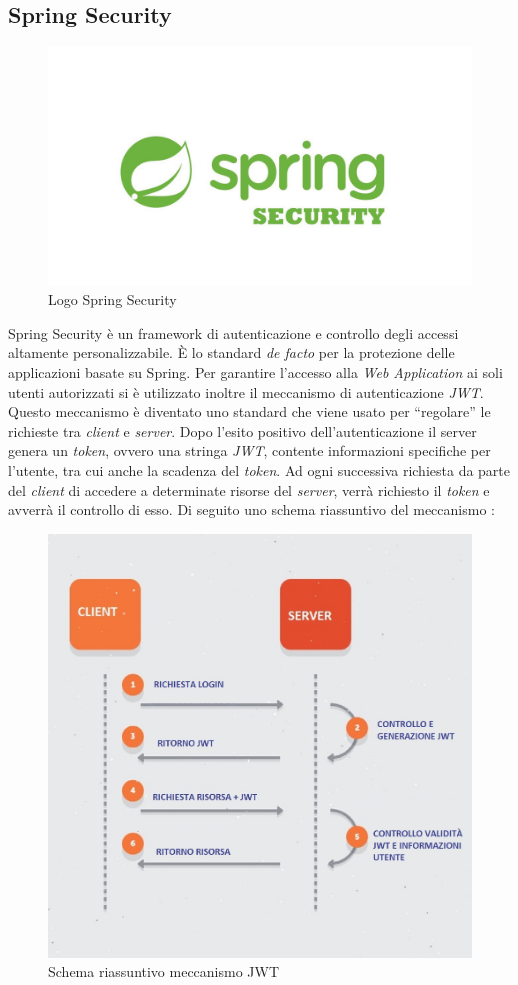 \subsection{Spring Security}

\begin{figure}
\begin{center}
\includegraphics[width=0.45\columnwidth]{images/springsec.jpeg}
\end{center}
\caption{Logo Spring Security}
\label{fig:springsec}
\end{figure}

Spring Security è un \gls{framework} di autenticazione e controllo degli accessi altamente personalizzabile. È lo standard \textit{de facto} per la protezione delle applicazioni basate su Spring. Per garantire l'accesso alla \textit{Web Application} ai soli utenti autorizzati si è utilizzato inoltre il meccanismo di autenticazione \textit{JWT}. Questo meccanismo è diventato uno standard che viene usato per “regolare” le richieste tra  \textit{client} e \textit{server}. Dopo l'esito positivo dell'autenticazione il server genera un \textit{token}, ovvero una stringa \textit{JWT}, contente informazioni specifiche per l'utente, tra cui anche la scadenza del \textit{token}. Ad ogni successiva richiesta da parte del \textit{client} di accedere a determinate risorse del \textit{server}, verrà richiesto il \textit{token} e avverrà il controllo di esso. Di seguito uno schema riassuntivo del meccanismo :

\begin{figure}
\begin{center}
\includegraphics[width=0.6\columnwidth]{images/jwt.jpg}
\end{center}
\caption{Schema riassuntivo meccanismo JWT}
\label{fig:jwt}
\end{figure}



